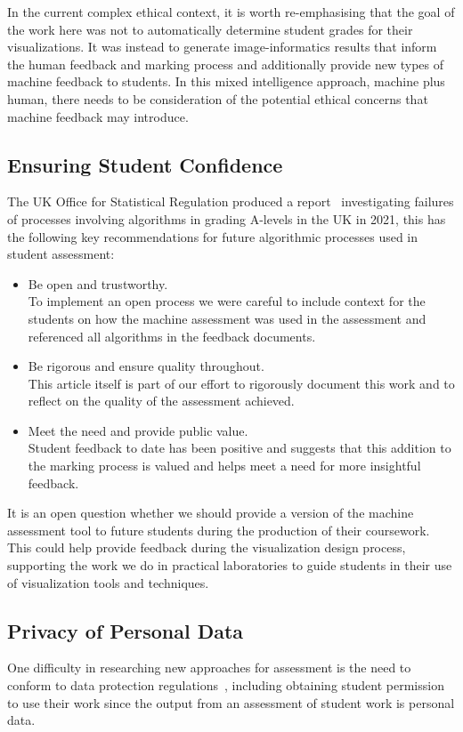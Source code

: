 In the current complex ethical context, it is worth re-emphasising that the goal of the work here was not to automatically determine student grades for their visualizations. It was instead to generate image-informatics results that inform the human feedback and marking process and additionally provide new types of machine feedback to students. In this mixed intelligence approach, machine plus human, there needs to be consideration of the potential ethical concerns that machine feedback may introduce. 

\subsection{Ensuring Student Confidence}
The UK Office for Statistical Regulation produced a report~\cite{OSR2021} investigating failures of processes involving algorithms in grading {A-levels} in the UK in 2021, this has the following key recommendations for future algorithmic processes used in student assessment:
\begin{itemize}
    \item Be open and trustworthy.\\
    To implement an open process we were careful to include context for the students on how the machine assessment was used in the assessment and referenced all algorithms in the feedback documents. 
    \item Be rigorous and ensure quality throughout. \\
    This article itself is part of our effort to rigorously document this work and to reflect on the quality of the assessment achieved. 
    \item Meet the need and provide public value.\\
    Student feedback to date has been positive and suggests that this addition to the marking process is valued and helps meet a need for more insightful feedback.
\end{itemize}
 It is an open question whether we should provide a version of the machine assessment tool to future students during the production of their coursework. This could help provide feedback during the visualization design process, supporting the work we do in practical laboratories to guide students in their use of visualization tools and techniques.

\subsection{Privacy of Personal Data}
One difficulty in researching new approaches for assessment is the need to conform to data protection regulations~\cite{GDPR2018}, including obtaining student permission to use their work since the output from an assessment of student work is personal data. 

